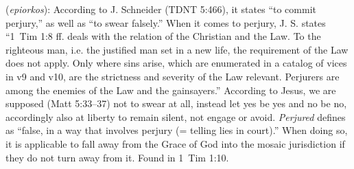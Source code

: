 \item[Perjured,]

(\textit{epiorkos}):
According to J. Schneider (TDNT 5:466), it states ``to commit perjury,'' as well as ``to swear falsely.'' When it comes to perjury, J. S. states ``1~Tim 1:8 ff. deals with the relation of the Christian and the Law. To the righteous man, i.e. the justified man set in a new life, the requirement of the Law does not apply. Only where sins arise, which are enumerated in a catalog of vices in v9 and v10, are the strictness and severity of the Law relevant. Perjurers are among the enemies of the Law and the gainsayers.'' According to Jesus, we are supposed (Matt 5:33--37) not to swear at all, instead let yes be yes and no be no, accordingly also at liberty to remain silent, not engage or avoid. \emph{Perjured} defines as ``false, in a way that involves perjury (= telling lies in court).'' When doing so, it is applicable to fall away from the Grace of God into the mosaic jurisdiction if they do not turn away from it.
Found in 1~Tim 1:10.

